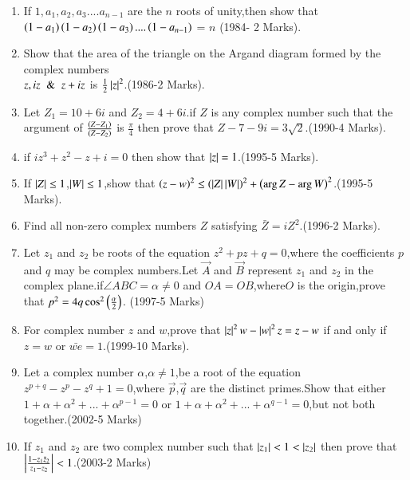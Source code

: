\documentclass[journal]{IEEEtran}
\begin{document}
\begin{enumerate}[start=7] %
\item If $1,a_{1},a_{2},a_{3}....a_{n-1}$ are the $n$ roots of unity,then show that $\left(1-a_1\right)\left(1-a_2\right)\left(1-a_3\right)....\left(1-a_{n-1}\right)$ = $n$ \hfill (1984- 2 Marks).\\
\item Show that the area of the triangle on the Argand diagram formed by the complex numbers\\
$z,iz \And z+iz$ is $\frac{1}{2}\left\vert z\right\vert^{2}$.\hfill (1986-2 Marks).\\
\item Let $Z_{1}=10+6i$ and $Z_{2}=4+6i$.if $Z$ is any complex number such that the argument of ${\frac{\left(Z-Z_1\right)}{\left(Z-Z_2\right)}}$ is ${\frac{\pi}{4}}$ then prove that $Z-7-9i=3\sqrt{2}$.\hfill(1990-4 Marks).\\
\item if {$iz^{3}+z^2-z+i=0$} then show that $\left\vert z\right\vert=1$.\hfill(1995-5 Marks).\\
\item If $\left\vert Z\right\vert\le1$,$\left\vert W\right\vert\le1$,show that $\left(z-w\right)^{2}\le\left(\left\vert Z\right\vert\left\vert W\right\vert\right)^{2}+\left(\arg Z-\arg W\right)^2$.\hfill(1995-5 Marks). \\
\item Find all non-zero complex numbers $Z$ satisfying $\bar Z=iZ^{2}$.\hfill(1996-2 Marks).\\
\item Let $z_{1}$ and $z_{2}$ be roots of the equation $z^{2}+pz+q=0$,where the coefficients $p$ and $q$ may be complex numbers.Let $\Vec{A}$ and $\Vec{B}$ represent $z_{1}$ and $z_{2}$ in the complex plane.if$\angle ABC=\alpha\not=0$ and $OA=OB$,where$O$ is the origin,prove that $p^{2}=4q\cos^{2}\left(\frac{\alpha}{2}\right)$. \hfill(1997-5 Marks)\\
\item For complex number $z$ and $w$,prove that $\left\vert z\right\vert^{2}w-\left\vert w\right\vert^{2}z=z-w$ if and only if $z=w$ or $\bar{we}=1$.\hfill(1999-10 Marks).\\
\item Let a complex number $\alpha$,$\alpha \not=1$,be a root of the equation $z^{p+q}-z^p-z^q+1=0$,where $\Vec{p}$,$\Vec{q}$ are the distinct primes.Show that either $1+\alpha+\alpha^{2}+...+\alpha^{p-1}=0$ or $1+\alpha+\alpha^{2}+...+\alpha^{q- 1}=0$,but not both together.\hfill(2002-5 Marks)\\
\item If $z_{1}$ and $z_{2}$ are two complex number such that $\left\vert z_{1}\right\vert<1<\left\vert z_{2}\right\vert$ then prove that  $\left\vert\frac{1-z_{1} \bar z_{2}}{z_{1}-z_{2}}\right\vert<1$.\hfill(2003-2 Marks)\\

\end{enumerate}
\end{document}
